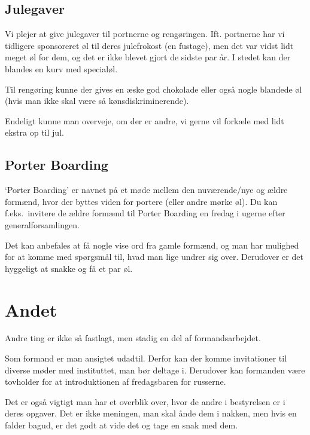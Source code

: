 \subsection{Julegaver}
\label{sec:julegaver}

Vi plejer at give julegaver til portnerne og
rengøringen. Ift. portnerne har vi tidligere sponsoreret øl til deres
julefrokost (en fustage), men det var vidst lidt meget øl for dem, og
det er ikke blevet gjort de sidste par år. I stedet kan der blandes en
kurv med specialøl.

Til rengøring kunne der gives en æske god chokolade eller også nogle
blandede øl (hvis man ikke skal være så kønsdiskriminerende).

Endeligt kunne man overveje, om der er andre, vi gerne vil forkæle med
lidt ekstra op til jul.

\subsection{Porter Boarding}
\label{sec:porter-boarding}

`Porter Boarding' er navnet på et møde mellem den nuværende/nye
og ældre formænd, hvor der byttes viden for portere (eller andre mørke
øl).
Du kan f.eks.~invitere de ældre formænd til Porter Boarding en fredag i ugerne efter
generalforsamlingen.

Det kan anbefales at få nogle vise ord fra gamle formænd, og man har
mulighed for at komme med spørgsmål til, hvad man lige undrer sig
over. Derudover er det hyggeligt at snakke og få et par øl.


\section{Andet}
\label{sec:andet}

Andre ting er ikke så fastlagt, men stadig en del af formandsarbejdet.

Som formand er man ansigtet udadtil. Derfor kan der komme invitationer
til diverse møder med instituttet, man bør deltage i.
Derudover kan formanden være tovholder for at introduktionen af fredagsbaren for
russerne.

Det er også vigtigt man har et overblik over, hvor de andre i
bestyrelsen er i deres opgaver. Det er ikke meningen, man skal ånde
dem i nakken, men hvis en falder bagud, er det godt at vide det og
tage en snak med dem.




